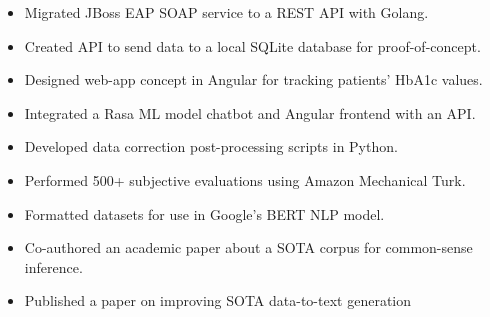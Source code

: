 \documentclass[10pt,a4paper,ragged2e]{altacv}
\begin{document}


\begin{fullwidth}
\makecvheader
\end{fullwidth}



\begin{itemize}
\item Migrated JBoss EAP SOAP service to a REST API with Golang.
\item Created API to send data to a local SQLite database for proof-of-concept.
\item Designed web-app concept in Angular for tracking patients' HbA1c values.
\item Integrated a Rasa ML model chatbot and Angular frontend with an API.
\end{itemize}

\divider

\begin{itemize}
\item Developed data correction post-processing scripts in Python.
\item Performed 500+ subjective evaluations using Amazon Mechanical Turk.
\item Formatted datasets for use in Google's BERT NLP model.
\item Co-authored an academic paper about a SOTA corpus for common-sense inference.
\item Published a paper on improving SOTA data-to-text generation
\end{itemize}
\end{document}
